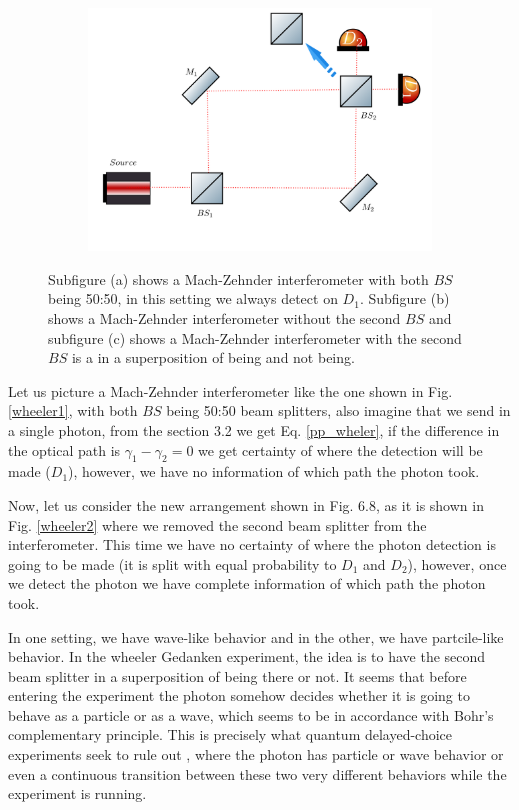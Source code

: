 \documentclass[12pt]{book}
\begin{document}
\begin{figure}[t!]
\begin{subfigure}{0.45\linewidth}
\includegraphics[width=\linewidth]{images/wheeler3.png}
\caption{}
\label{wheeler3}
\end{subfigure}
\caption{Subfigure (a) shows a Mach-Zehnder interferometer with both $BS$ being 50:50, in this setting we always detect on $D_{1}$. Subfigure (b) shows a Mach-Zehnder interferometer without the second $BS$ and subfigure (c) shows a Mach-Zehnder interferometer with the second $BS$ is a in a superposition of being and not being.}
\label{fig:fig}
\end{figure}

Let us picture a Mach-Zehnder interferometer like the one shown in Fig. \ref{wheeler1}, with both $BS$ being 50:50 beam splitters, also imagine that we send in a single photon, from the section 3.2 we get Eq. \ref{pp_wheler}, if the difference in the optical path is $\gamma_{1}-\gamma_{2}=0$  we get certainty of where the detection will be made ($D_{1}$), however, we have no information of which path the photon took.



Now, let us consider the new arrangement shown in Fig. 6.8, as it is shown in Fig. \ref{wheeler2} where we removed the second beam splitter from the interferometer. This time we have no certainty of where the photon detection is going to be made (it is split with equal probability to $D_{1}$ and $D_{2}$), however, once we detect the photon we have complete information of which path the photon took.



In one setting, we have wave-like behavior and in the other, we have partcile-like behavior. In the wheeler Gedanken experiment, the idea is to have the second beam splitter in a superposition of being there or not. It seems that before entering the experiment the photon somehow decides whether it is going to behave as a particle or as a wave, which seems to be in accordance with Bohr's complementary principle. This is precisely what quantum delayed-choice experiments seek to rule out \cite{Ma}, where the photon has particle or wave behavior or even a continuous transition between these two very different behaviors while the experiment is running.
\end{document}
